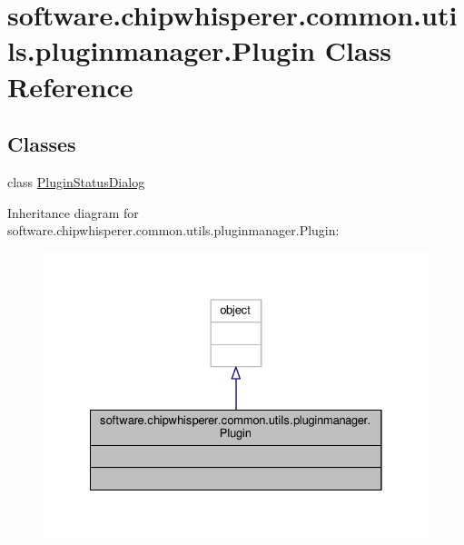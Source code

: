 \hypertarget{classsoftware_1_1chipwhisperer_1_1common_1_1utils_1_1pluginmanager_1_1Plugin}{}\section{software.\+chipwhisperer.\+common.\+utils.\+pluginmanager.\+Plugin Class Reference}
\label{classsoftware_1_1chipwhisperer_1_1common_1_1utils_1_1pluginmanager_1_1Plugin}
\subsection*{Classes}
\begin{DoxyCompactItemize}
\item 
class \hyperlink{classsoftware_1_1chipwhisperer_1_1common_1_1utils_1_1pluginmanager_1_1Plugin_1_1PluginStatusDialog}{Plugin\+Status\+Dialog}
\end{DoxyCompactItemize}


Inheritance diagram for software.\+chipwhisperer.\+common.\+utils.\+pluginmanager.\+Plugin\+:\nopagebreak
\begin{figure}[H]
\begin{center}
\leavevmode
\includegraphics[width=328pt]{da/de9/classsoftware_1_1chipwhisperer_1_1common_1_1utils_1_1pluginmanager_1_1Plugin__inherit__graph}
\end{center}
\end{figure}



